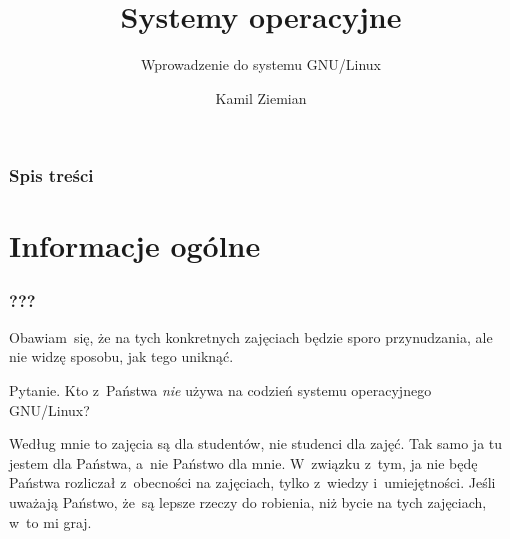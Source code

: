 \documentclass[10pt,t]{beamer}
\title{Systemy operacyjne}
\subtitle{Wprowadzenie do systemu GNU/Linux}
\author{Kamil Ziemian}
\date{}
\begin{document}





\RaggedRight





\maketitle





\begin{frame}
  \frametitle{Spis treści}


  \tableofcontents

\end{frame}





\section{Informacje ogólne}


\begin{frame}
  \frametitle{???}


  Obawiam~się, że na tych konkretnych zajęciach będzie sporo przynudzania,
  ale nie widzę sposobu, jak tego uniknąć.

  Pytanie. Kto z~Państwa \textit{nie} używa na codzień systemu operacyjnego
  GNU/Linux?

  Według mnie to zajęcia są dla studentów, nie studenci dla zajęć. Tak samo
  ja tu jestem dla Państwa, a~nie Państwo dla mnie. W~związku z~tym, ja nie
  będę Państwa rozliczał z~obecności na zajęciach, tylko z~wiedzy
  i~umiejętności. Jeśli uważają Państwo, że~są lepsze rzeczy do robienia,
  niż bycie na tych zajęciach, w~to mi graj.

\end{frame}











\printbibliography





\end{document}
